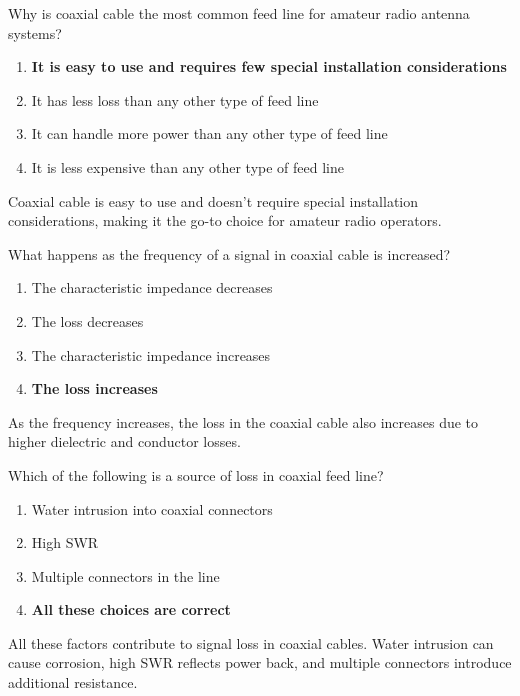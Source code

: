 \begin{tcolorbox}[colback=gray!10!white,colframe=black!75!black,title={T9B03}]
Why is coaxial cable the most common feed line for amateur radio antenna systems?
\begin{enumerate}[label=\Alph*),noitemsep]
    \item \textbf{It is easy to use and requires few special installation considerations}
    \item It has less loss than any other type of feed line
    \item It can handle more power than any other type of feed line
    \item It is less expensive than any other type of feed line
\end{enumerate}
\end{tcolorbox}
Coaxial cable is easy to use and doesn't require special installation considerations, making it the go-to choice for amateur radio operators.

\begin{tcolorbox}[colback=gray!10!white,colframe=black!75!black,title={T9B05}]
What happens as the frequency of a signal in coaxial cable is increased?
\begin{enumerate}[label=\Alph*),noitemsep]
    \item The characteristic impedance decreases
    \item The loss decreases
    \item The characteristic impedance increases
    \item \textbf{The loss increases}
\end{enumerate}
\end{tcolorbox}
As the frequency increases, the loss in the coaxial cable also increases due to higher dielectric and conductor losses.

\begin{tcolorbox}[colback=gray!10!white,colframe=black!75!black,title={T9B08}]
Which of the following is a source of loss in coaxial feed line?
\begin{enumerate}[label=\Alph*),noitemsep]
    \item Water intrusion into coaxial connectors
    \item High SWR
    \item Multiple connectors in the line
    \item \textbf{All these choices are correct}
\end{enumerate}
\end{tcolorbox}
All these factors contribute to signal loss in coaxial cables. Water intrusion can cause corrosion, high SWR reflects power back, and multiple connectors introduce additional resistance.

